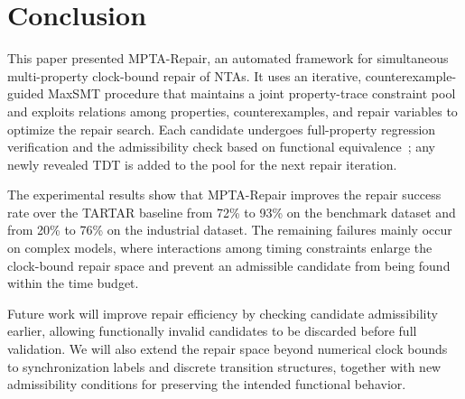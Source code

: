 \section{Conclusion}
\label{sec:conclusion}

This paper presented MPTA-Repair, an automated framework for
simultaneous multi-property clock-bound repair of NTAs. It uses an
iterative, counterexample-guided MaxSMT procedure that maintains a joint
property-trace constraint pool and exploits relations among properties,
counterexamples, and repair variables to optimize the repair search.
Each candidate undergoes full-property regression verification and the
admissibility check based on functional equivalence~\cite{kolbl2019clock};
any newly revealed TDT is added to the pool for the next repair
iteration.

The experimental results show that MPTA-Repair improves the repair
success rate over the TARTAR baseline from 72\% to 93\% on the benchmark
dataset and from 20\% to 76\% on the industrial dataset. The remaining
failures mainly occur on complex models, where interactions among timing
constraints enlarge the clock-bound repair space and prevent an
admissible candidate from being found within the time budget.

Future work will improve repair efficiency by checking candidate
admissibility earlier, allowing functionally invalid candidates to be
discarded before full validation. We will also extend the repair space
beyond numerical clock bounds to synchronization labels and discrete
transition structures, together with new admissibility conditions for
preserving the intended functional behavior.
